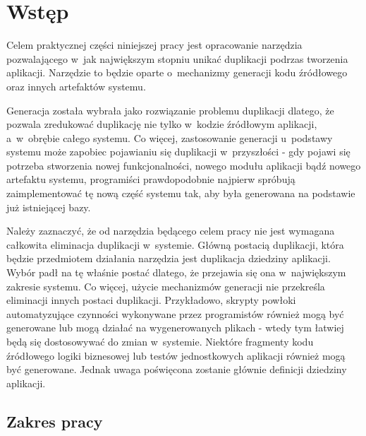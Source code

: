 \chapter{Wstęp} \label{chap:intro}

Celem praktycznej części niniejszej pracy jest opracowanie narzędzia pozwalającego w~jak największym stopniu unikać duplikacji podrzas tworzenia aplikacji.
Narzędzie to będzie oparte o~mechanizmy generacji kodu źródłowego oraz innych artefaktów systemu.

Generacja została wybrała jako rozwiązanie problemu duplikacji dlatego, że pozwala zredukować duplikację nie tylko w~kodzie źródłowym aplikacji, a~w~obrębie całego systemu.
Co więcej, zastosowanie generacji u~podstawy systemu może zapobiec pojawianiu się duplikacji w~przyszłości - gdy pojawi się potrzeba stworzenia nowej funkcjonalności, nowego modułu aplikacji bądź nowego artefaktu systemu, programiści prawdopodobnie najpierw spróbują zaimplementować tę nową część systemu tak, aby była generowana na podstawie już istniejącej bazy.

Należy zaznaczyć, że od narzędzia będącego celem pracy nie jest wymagana całkowita eliminacja duplikacji w~systemie.
Główną postacią duplikacji, która będzie przedmiotem działania narzędzia jest duplikacja dziedziny aplikacji.
Wybór padł na tę właśnie postać dlatego, że przejawia się ona w~największym zakresie systemu.
Co więcej, użycie mechanizmów generacji nie przekreśla eliminacji innych postaci duplikacji.
Przykładowo, skrypty powłoki automatyzujące czynności wykonywane przez programistów również mogą być generowane lub mogą działać na wygenerowanych plikach - wtedy tym łatwiej będą się dostosowywać do zmian w~systemie.
Niektóre fragmenty kodu źródłowego logiki biznesowej lub testów jednostkowych aplikacji również mogą być generowane.
Jednak uwaga poświęcona zostanie głównie definicji dziedziny aplikacji.



\section{Zakres pracy}

